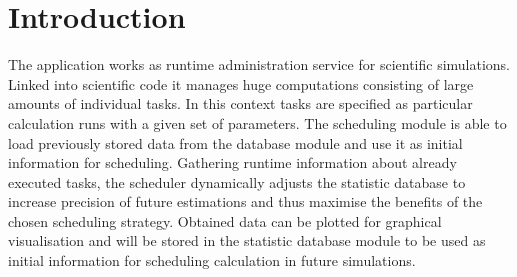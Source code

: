 \section{Introduction}







The application works as runtime administration service for scientific simulations. Linked into scientific code it manages huge computations consisting of large amounts of individual tasks. In this context tasks are specified as particular calculation runs with a given set of parameters. The scheduling module is able to load previously stored data from the database module and use it as initial information for scheduling. Gathering runtime information about already executed tasks, the scheduler dynamically adjusts the statistic database to increase precision of future estimations and thus maximise the benefits of the chosen scheduling strategy. Obtained data can be plotted for graphical visualisation and will be stored in the statistic database module to be used as initial information for scheduling calculation in future simulations.


